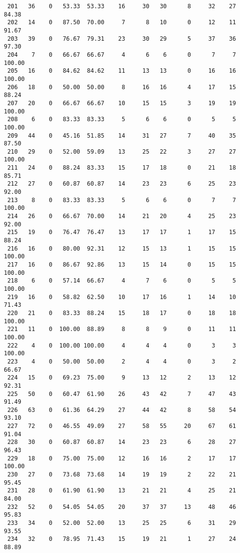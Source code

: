 \begin{verbatim}
 201   36    0   53.33  53.33    16     30   30      8     32    27    84.38
 202   14    0   87.50  70.00     7      8   10      0     12    11    91.67
 203   39    0   76.67  79.31    23     30   29      5     37    36    97.30
 204    7    0   66.67  66.67     4      6    6      0      7     7   100.00
 205   16    0   84.62  84.62    11     13   13      0     16    16   100.00
 206   18    0   50.00  50.00     8     16   16      4     17    15    88.24
 207   20    0   66.67  66.67    10     15   15      3     19    19   100.00
 208    6    0   83.33  83.33     5      6    6      0      5     5   100.00
 209   44    0   45.16  51.85    14     31   27      7     40    35    87.50
 210   29    0   52.00  59.09    13     25   22      3     27    27   100.00
 211   24    0   88.24  83.33    15     17   18      0     21    18    85.71
 212   27    0   60.87  60.87    14     23   23      6     25    23    92.00
 213    8    0   83.33  83.33     5      6    6      0      7     7   100.00
 214   26    0   66.67  70.00    14     21   20      4     25    23    92.00
 215   19    0   76.47  76.47    13     17   17      1     17    15    88.24
 216   16    0   80.00  92.31    12     15   13      1     15    15   100.00
 217   16    0   86.67  92.86    13     15   14      0     15    15   100.00
 218    6    0   57.14  66.67     4      7    6      0      5     5   100.00
 219   16    0   58.82  62.50    10     17   16      1     14    10    71.43
 220   21    0   83.33  88.24    15     18   17      0     18    18   100.00
 221   11    0  100.00  88.89     8      8    9      0     11    11   100.00
 222    4    0  100.00 100.00     4      4    4      0      3     3   100.00
 223    4    0   50.00  50.00     2      4    4      0      3     2    66.67
 224   15    0   69.23  75.00     9     13   12      2     13    12    92.31
 225   50    0   60.47  61.90    26     43   42      7     47    43    91.49
 226   63    0   61.36  64.29    27     44   42      8     58    54    93.10
 227   72    0   46.55  49.09    27     58   55     20     67    61    91.04
 228   30    0   60.87  60.87    14     23   23      6     28    27    96.43
 229   18    0   75.00  75.00    12     16   16      2     17    17   100.00
 230   27    0   73.68  73.68    14     19   19      2     22    21    95.45
 231   28    0   61.90  61.90    13     21   21      4     25    21    84.00
 232   52    0   54.05  54.05    20     37   37     13     48    46    95.83
 233   34    0   52.00  52.00    13     25   25      6     31    29    93.55
 234   32    0   78.95  71.43    15     19   21      1     27    24    88.89

\end{verbatim}
